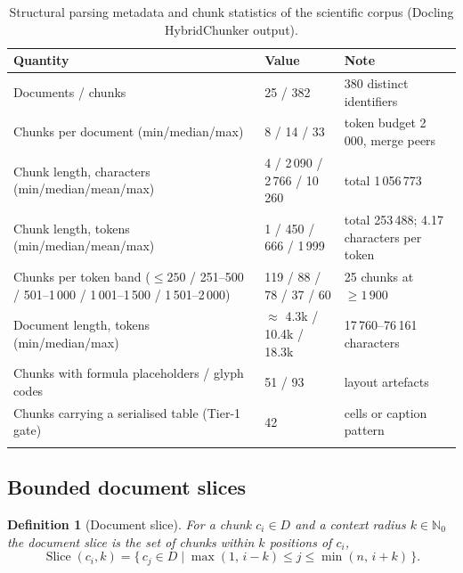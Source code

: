 \documentclass[pdflatex,sn-mathphys-num]{sn-jnl}
\newcommand{\Slice}{\operatorname{Slice}}
\theoremstyle{thmstyleone}%
\theoremstyle{thmstylethree}%
\newtheorem{definition}{Definition}%
\begin{document}
\begin{table}[htbp]
\caption{Structural parsing metadata and chunk statistics of the scientific corpus (Docling HybridChunker output).}\label{tab:parsing}
\begin{tabular}{@{}p{5.4cm}p{4.0cm}p{2.8cm}@{}}
\toprule
Quantity & Value & Note \\
\midrule
Documents / chunks & 25 / 382 & 380 distinct identifiers\footnotemark[1] \\
Chunks per document (min/median/max) & 8 / 14 / 33 & token budget 2\,000, merge peers \\
Chunk length, characters (min/median/mean/max) & 4 / 2\,090 / 2\,766 / 10\,260 & total 1\,056\,773 \\
Chunk length, tokens (min/median/mean/max) & 1 / 450 / 666 / 1\,999 & total 253\,488; 4.17 characters per token \\
Chunks per token band ($\le 250$ / 251--500 / 501--1\,000 / 1\,001--1\,500 / 1\,501--2\,000) & 119 / 88 / 78 / 37 / 60 & 25 chunks at $\ge 1\,900$ \\
Document length, tokens (min/median/max) & $\approx$ 4.3k / 10.4k / 18.3k & 17\,760--76\,161 characters \\
Chunks with formula placeholders / glyph codes & 51 / 93 & layout artefacts \\
Chunks carrying a serialised table (Tier-1 gate) & 42 & cells or caption pattern \\
\botrule
\end{tabular}
\end{table}

\subsection{Bounded document slices}\label{sec:slice}

\begin{definition}[Document slice]
For a chunk $c_i\in D$ and a context radius $k\in\mathbb{N}_0$ the document slice is the set of chunks within $k$ positions of $c_i$,
\begin{equation}\label{eq:slice}
\Slice(c_i,k)=\{\,c_j\in D \mid \max(1,\,i-k)\le j\le \min(n,\,i+k)\,\}.
\end{equation}
\end{definition}
\end{document}
